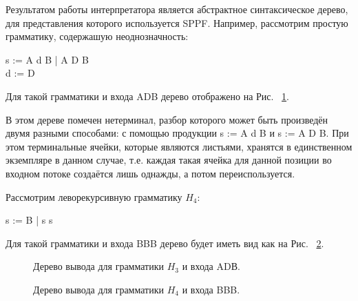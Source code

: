 Результатом работы интерпретатора является абстрактное синтаксическое дерево, для представления которого используется SPPF. Например, рассмотрим простую грамматику, содержашую неоднозначность:
\begin{center}
    s := A d B | A D B
    \\d := D
\end{center}

Для такой грамматики и входа ADB дерево отображено на Рис. ~\ref{fig8}.

В этом дереве помечен нетерминал, разбор которого может быть произведён двумя разными способами: с помощью продукции s := A d B и s := A D B. При этом терминальные ячейки, которые являются листьями, хранятся в единственном экземпляре в данном случае, т.е. каждая такая ячейка для данной позиции во входном потоке создаётся лишь однажды, а потом переиспользуется.

Рассмотрим леворекурсивную грамматику $H_4$:
\begin{center}
    s := B | s s
\end{center}

Для такой грамматики и входа BBB дерево будет иметь вид как на  Рис. ~\ref{fig9}.


\begin{figure}[h]
\caption{Дерево вывода для грамматики $H_3$ и входа ADВ.}
\label{fig8}
\end{figure}
\pagebreak
\begin{figure}[h]
\caption{Дерево вывода для грамматики $H_4$ и входа BBB.}
\label{fig9}
\end{figure}

